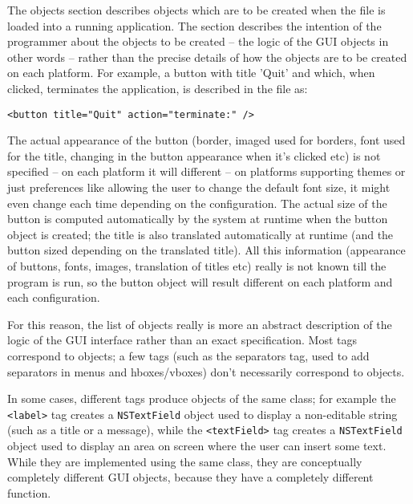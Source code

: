 The objects section describes objects which are to be created when the
file is loaded into a running application.  The section describes the
intention of the programmer about the objects to be created -- the
logic of the GUI objects in other words -- rather than the precise
details of how the objects are to be created on each platform.  For
example, a button with title 'Quit' and which, when clicked,
terminates the application, is described in the file as:
\begin{verbatim}
<button title="Quit" action="terminate:" />
\end{verbatim}
The actual appearance of the button (border, imaged used for borders,
font used for the title, changing in the button appearance when it's
clicked etc) is not specified -- on each platform it will different --
on platforms supporting themes or just preferences like allowing the
user to change the default font size, it might even change each time
depending on the configuration.  The actual size of the button is
computed automatically by the system at runtime when the button object
is created; the title is also translated automatically at runtime (and
the button sized depending on the translated title).  All this
information (appearance of buttons, fonts, images, translation of
titles etc) really is not known till the program is run, so the button
object will result different on each platform and each configuration.

For this reason, the list of objects really is more an abstract
description of the logic of the GUI interface rather than an exact
specification.  Most tags correspond to objects; a few tags (such as
the separators tag, used to add separators in menus and hboxes/vboxes)
don't necessarily correspond to objects.

In some cases, different tags produce objects of the same class; for
example the \texttt{<label>} tag creates a \texttt{NSTextField} object
used to display a non-editable string (such as a title or a message),
while the \texttt{<textField>} tag creates a \texttt{NSTextField}
object used to display an area on screen where the user can insert
some text.  While they are implemented using the same class, they are
conceptually completely different GUI objects, because they have a
completely different function.

